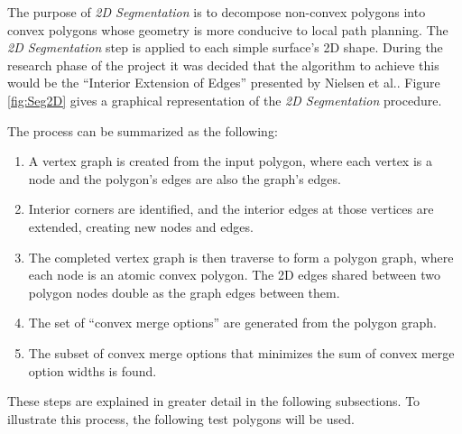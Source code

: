 The purpose of \textit{2D Segmentation} is to decompose non-convex polygons into convex polygons whose geometry is more conducive to local path planning.
The \textit{2D Segmentation} step is applied to each simple surface's 2D shape.
During the research phase of the project it was decided that the algorithm to achieve this would be the ``Interior Extension of Edges'' presented by Nielsen et al.\cite{IntEdgeExt}.
Figure \ref{fig:Seg2D} gives a graphical representation of the \textit{2D Segmentation} procedure.

The process can be summarized as the following:
\begin{enumerate}
	\item A vertex graph is created from the input polygon, where each vertex is a node and the polygon's edges are also the graph's edges.
	\item Interior corners are identified, and the interior edges at those vertices are extended, creating new nodes and edges.
	\item The completed vertex graph is then traverse to form a polygon graph, where each node is an atomic convex polygon.
		The 2D edges shared between two polygon nodes double as the graph edges between them.
	\item The set of ``convex merge options'' are generated from the polygon graph.
	\item The subset of convex merge options that minimizes the sum of convex merge option widths is found.
\end{enumerate}
These steps are explained in greater detail in the following subsections.
To illustrate this process, the following test polygons will be used.

